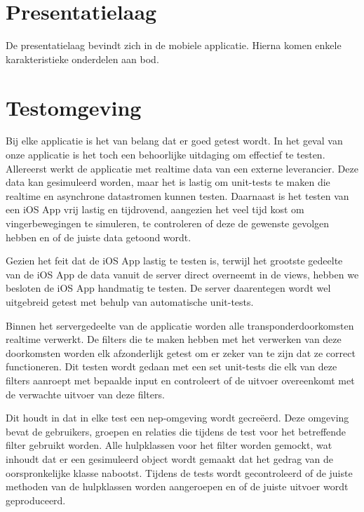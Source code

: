 \section{Presentatielaag}
  De presentatielaag bevindt zich in de mobiele applicatie. Hierna komen enkele karakteristieke onderdelen aan bod.
  

\section{Testomgeving}
Bij elke applicatie is het van belang dat er goed getest wordt. In het geval van onze applicatie is het toch een behoorlijke uitdaging om effectief te testen. Allereerst werkt de applicatie met realtime data van een externe leverancier. Deze data kan gesimuleerd worden, maar het is lastig om unit-tests te maken die realtime en asynchrone datastromen kunnen testen. Daarnaast is het testen van een iOS App vrij lastig en tijdrovend, aangezien het veel tijd kost om vingerbewegingen te simuleren, te controleren of deze de gewenste gevolgen hebben en of de juiste data getoond wordt.

Gezien het feit dat de iOS App lastig te testen is, terwijl het grootste gedeelte van de iOS App de data vanuit de server direct overneemt in de views, hebben we besloten de iOS App handmatig te testen. De server daarentegen wordt wel uitgebreid getest met behulp van automatische unit-tests. 

Binnen het servergedeelte van de applicatie worden alle transponderdoorkomsten realtime verwerkt. De filters die te maken hebben met het verwerken van deze doorkomsten worden elk afzonderlijk getest om er zeker van te zijn dat ze correct functioneren. Dit testen wordt gedaan met een set unit-tests die elk van deze filters aanroept met bepaalde input en controleert of de uitvoer overeenkomt met de verwachte uitvoer van deze filters.

Dit houdt in dat in elke test een nep-omgeving wordt gecreëerd. Deze omgeving bevat de gebruikers, groepen en relaties die tijdens de test voor het betreffende filter gebruikt worden. Alle hulpklassen voor het filter worden gemockt, wat inhoudt dat er een gesimuleerd object wordt gemaakt dat het gedrag van de oorspronkelijke klasse nabootst. Tijdens de tests wordt gecontroleerd of de juiste methoden van de hulpklassen worden aangeroepen en of de juiste uitvoer wordt geproduceerd.

